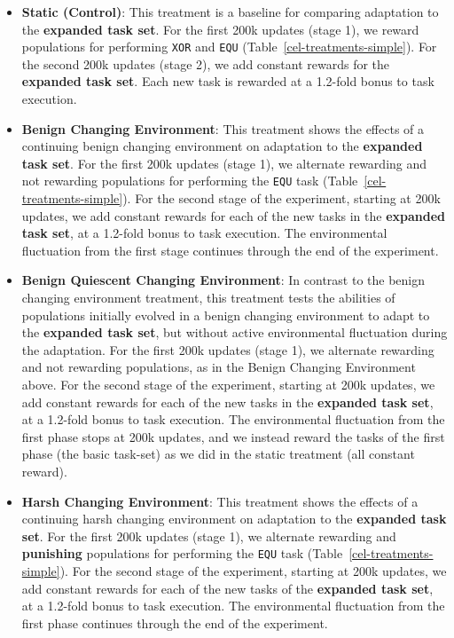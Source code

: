 \documentclass[10pt,letterpaper,final]{article}
\begin{document}
\begin{itemize}
	\item \textbf{Static (Control)}: This treatment is a baseline for comparing adaptation to the \textbf{expanded task set}. For the first 200k updates (stage 1), we reward populations for performing  \texttt{XOR} and \texttt{EQU} (Table~\ref{cel-treatments-simple}). For the second 200k updates (stage 2), we add constant rewards for the \textbf{expanded task set}. Each new task is rewarded at a 1.2-fold bonus to task execution.

	\item \textbf{Benign Changing Environment}: This treatment shows the effects of a continuing benign changing environment on adaptation to the \textbf{expanded task set}. For the first 200k updates (stage 1), we alternate rewarding and not rewarding populations for performing the \texttt{EQU} task (Table~\ref{cel-treatments-simple}). For the second stage of the experiment, starting at 200k updates, we add constant rewards for each of the new tasks in the \textbf{expanded task set}, at a 1.2-fold bonus to task execution. The environmental fluctuation from the first stage continues through the end of the experiment.

	\item \textbf{Benign Quiescent Changing Environment}: In contrast to the benign changing environment treatment, this treatment tests the abilities of populations initially evolved in a benign changing environment to adapt to the \textbf{expanded task set}, but without active environmental fluctuation during the adaptation. For the first 200k updates (stage 1), we alternate rewarding and not rewarding populations, as in the Benign Changing Environment above. For the second stage of the experiment, starting at 200k updates, we add constant rewards for each of the new tasks in the \textbf{expanded task set}, at a 1.2-fold bonus to task execution. The environmental fluctuation from the first phase stops at 200k updates, and we instead reward the tasks of the first phase (the basic task-set) as we did in the static treatment (all constant reward).

	\item \textbf{Harsh Changing Environment}: This treatment shows the effects of a continuing harsh changing environment on adaptation to the \textbf{expanded task set}. For the first 200k updates (stage 1), we alternate rewarding and \textbf{punishing} populations for performing the \texttt{EQU} task (Table~\ref{cel-treatments-simple}). For the second stage of the experiment, starting at 200k updates, we add constant rewards for each of the new tasks of the \textbf{expanded task set}, at a 1.2-fold bonus to task execution. The environmental fluctuation from the first phase continues through the end of the experiment.


\end{itemize}
\end{document}
